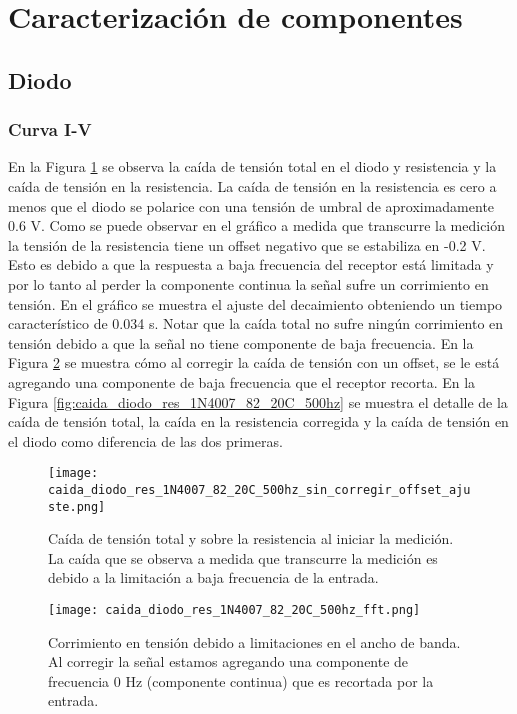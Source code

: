\documentclass[a4paper, 11pt]{article}
\begin{document}
\section*{Caracterización de componentes}

\subsection*{Diodo}
\subsubsection*{Curva I-V}
En la Figura \ref{fig:caida_diodo_res_1N4007_82_20C_500hz_sin_corregir_offset_ajuste} se observa la caída de tensión total en el diodo y resistencia y la caída de tensión en la resistencia. La caída de tensión en la resistencia es cero a menos que el diodo se polarice con una tensión de umbral de aproximadamente 0.6 V. Como se puede observar en el gráfico a medida que transcurre la medición la tensión de la resistencia tiene un offset negativo que se estabiliza en -0.2 V. Esto es debido a que la respuesta a baja frecuencia del receptor está limitada y por lo tanto al perder la componente continua la señal sufre un corrimiento en tensión. En el gráfico se muestra el ajuste del decaimiento obteniendo un tiempo característico de 0.034 s. Notar que la caída total no sufre ningún corrimiento en tensión debido a que la señal no tiene componente de baja frecuencia. 
En la Figura \ref{fig:caida_diodo_res_1N4007_82_20C_500hz_fft} se muestra cómo al corregir la caída de tensión con un offset, se le está agregando una componente de baja frecuencia que el receptor recorta. En la Figura \ref{fig:caida_diodo_res_1N4007_82_20C_500hz} se muestra el detalle de la caída de tensión total, la caída en la resistencia corregida y la caída de tensión en el diodo como diferencia de las dos primeras.

\begin{figure} [H]
\centering
\texttt{[image: caida\_diodo\_res\_1N4007\_82\_20C\_500hz\_sin\_corregir\_offset\_ajuste.png]}
\caption{Caída de tensión total y sobre la resistencia al iniciar la medición. La caída que se observa a medida que transcurre la medición es debido a la limitación a baja frecuencia de la entrada. \label{fig:caida_diodo_res_1N4007_82_20C_500hz_sin_corregir_offset_ajuste}}
\end{figure} 

\begin{figure} [H]
\centering
\texttt{[image: caida\_diodo\_res\_1N4007\_82\_20C\_500hz\_fft.png]}
\caption{Corrimiento en tensión debido a limitaciones en el ancho de banda. Al corregir la señal estamos agregando una componente de frecuencia 0 Hz (componente continua) que es recortada por la entrada. \label{fig:caida_diodo_res_1N4007_82_20C_500hz_fft}}
\end{figure} 
\end{document}
